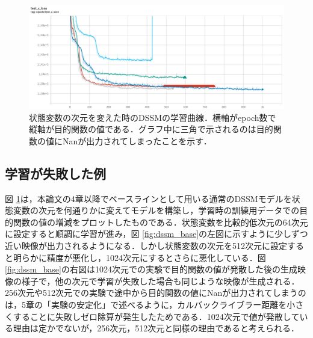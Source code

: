 \documentclass[10pt, twocolumn]{jarticle}
\begin{document}
\begin{figure}[bp]
  \begin{center}
    \includegraphics[width=\linewidth]{./figures/dssm_curve.png}
    \caption[状態変数の次元を変えた時のDSSMの学習曲線]{状態変数の次元を変えた時のDSSMの学習曲線．横軸がepoch数で縦軸が目的関数の値である．グラフ中に三角で示されるのは目的関数の値にNanが出力されてしまったことを示す．}
    \label{fig:dssm_curve}
  \end{center}
\end{figure}

\subsection{学習が失敗した例}
図 \ref{fig:dssm_curve}は，本論文の4章以降でベースラインとして用いる通常のDSSMモデルを状態変数の次元を何通りかに変えてモデルを構築し，学習時の訓練用データでの目的関数の値の増減をプロットしたものである．状態変数を比較的低次元の64次元に設定すると順調に学習が進み，図 \ref{fig:dssm_base}の左図に示すように少しずつ近い映像が出力されるようになる．しかし状態変数の次元を512次元に設定すると明らかに精度が悪化し，1024次元にするとさらに悪化している．図 \ref{fig:dssm_base}の右図は1024次元での実験で目的関数の値が発散した後の生成映像の様子で，他の次元で学習が失敗した場合も同じような映像が生成される．256次元や512次元での実験で途中から目的関数の値にNanが出力されてしまうのは，5章の「実験の安定化」で述べるように，カルバックライブラー距離を小さくすることに失敗しゼロ除算が発生したためである．1024次元で値が発散している理由は定かでないが，256次元，512次元と同様の理由であると考えられる．
\end{document}
